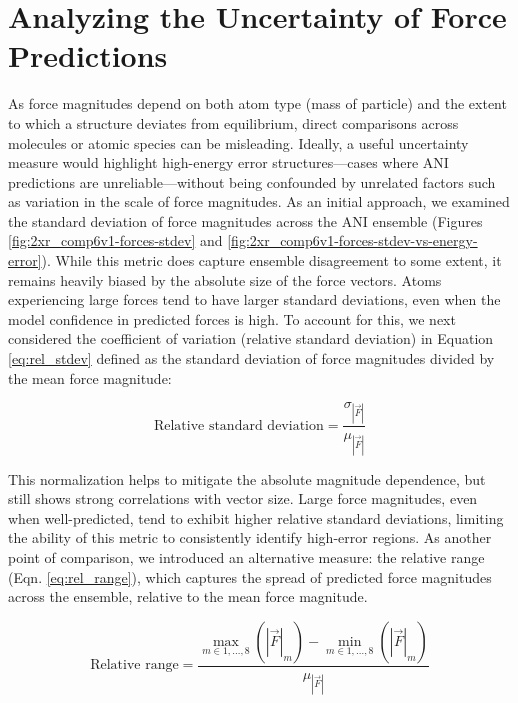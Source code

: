 \section{Analyzing the Uncertainty of Force Predictions}
\label{sec:analyzing_force_uncertainty}

As force magnitudes depend on both atom type (mass of particle) and the extent to which a structure deviates from equilibrium, direct comparisons across molecules or atomic species can be misleading. 
Ideally, a useful uncertainty measure would highlight high-energy error structures---cases where ANI predictions are unreliable---without being confounded by unrelated factors such as variation in the scale of force magnitudes.
As an initial approach, we examined the standard deviation of force magnitudes across the ANI ensemble (Figures \ref{fig:2xr_comp6v1-forces-stdev} and \ref{fig:2xr_comp6v1-forces-stdev-vs-energy-error}). 
While this metric does capture ensemble disagreement to some extent, it remains heavily biased by the absolute size of the force vectors.
Atoms experiencing large forces tend to have larger standard deviations, even when the model confidence in predicted forces is high. 
To account for this, we next considered the coefficient of variation (relative standard deviation) in Equation \ref{eq:rel_stdev} defined as the standard deviation of force magnitudes divided by the mean force magnitude:

\begin{equation} 
\text{Relative standard deviation} = \frac{\sigma_{|\vec{F}|}}{\mu_{|\vec{F}|}}
\label{eq:rel_stdev}
\end{equation}

This normalization helps to mitigate the absolute magnitude dependence, but still shows strong correlations with vector size. 
Large force magnitudes, even when well-predicted, tend to exhibit higher relative standard deviations, limiting the ability of this metric to consistently identify high-error regions.
As another point of comparison, we introduced an alternative measure: the relative range (Eqn. \ref{eq:rel_range}), which captures the spread of predicted force magnitudes across the ensemble, relative to the mean force magnitude.

\begin{equation} 
\text{Relative range} = 
\frac{\max\limits_{m \in {1, \dots, 8}}\left( |\vec{F}|_m \right) - \min\limits_{m \in {1, \dots, 8}} \left( |\vec{F}|_m \right)}
                            {\mu_{|\vec{F}|}} 
\label{eq:rel_range}
\end{equation}

